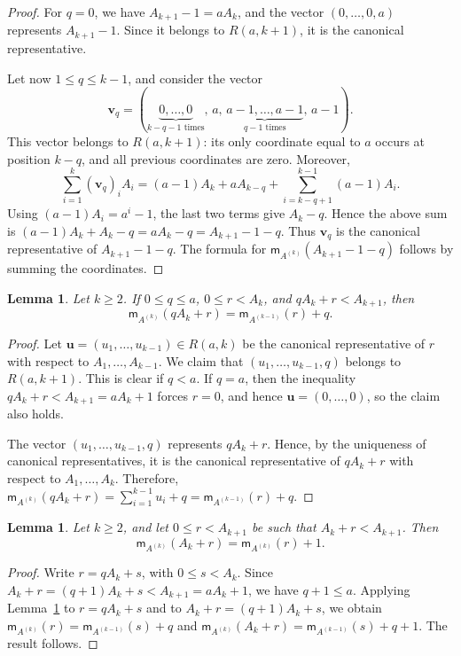 \documentclass[12pt,a4paper]{amsart}
\newtheorem{lemma}[theorem]{Lemma}
\theoremstyle{definition}
\begin{document}
\begin{proof}
For $q=0$, we have $A_{k+1}-1=aA_k$, and the vector $(0,\ldots,0,a)$ represents $A_{k+1}-1$. Since it belongs to $R(a,k+1)$, it is the canonical representative.

Let now $1\le q\le k-1$, and consider the vector
\[
\mathbf v_q=(\underbrace{0,\ldots,0}_{k-q-1\text{ times}},\,a,\,
\underbrace{a-1,\ldots,a-1}_{q-1\text{ times}},\,a-1).
\]
This vector belongs to $R(a,k+1)$: its only coordinate equal to $a$ occurs at position $k-q$, and all previous coordinates are zero. Moreover,
\[
\sum_{i=1}^k(\mathbf v_q)_iA_i
=(a-1)A_k+aA_{k-q}+\sum_{i=k-q+1}^{k-1}(a-1)A_i.
\]
Using $(a-1)A_i=a^i-1$, the last two terms give $A_k-q$. Hence the above sum is $(a-1)A_k+A_k-q=aA_k-q=A_{k+1}-1-q$. Thus $\mathbf v_q$ is the canonical representative of $A_{k+1}-1-q$. The formula for $\mathsf m_{A^{(k)}}(A_{k+1}-1-q)$ follows by summing the coordinates.
\end{proof}

\begin{lemma}\label{lem:splitting-lambda}
Let $k\ge 2$. If $0\le q\le a$, $0\le r<A_k$, and $qA_k+r<A_{k+1}$, then
\[
\mathsf m_{A^{(k)}}(qA_k+r)=\mathsf m_{A^{(k-1)}}(r)+q.
\]
\end{lemma}

\begin{proof}
Let $\mathbf u=(u_1,\ldots,u_{k-1})\in R(a,k)$ be the canonical representative of $r$ with respect to $A_1,\ldots,A_{k-1}$. We claim that $(u_1,\ldots,u_{k-1},q)$ belongs to $R(a,k+1)$. This is clear if $q<a$. If $q=a$, then the inequality $qA_k+r<A_{k+1}=aA_k+1$ forces $r=0$, and hence $\mathbf u=(0,\ldots,0)$, so the claim also holds.

The vector $(u_1,\ldots,u_{k-1},q)$ represents $qA_k+r$. Hence, by the uniqueness of canonical representatives, it is the canonical representative of $qA_k+r$ with respect to $A_1,\ldots,A_k$. Therefore, $\mathsf m_{A^{(k)}}(qA_k+r)=\sum_{i=1}^{k-1}u_i+q=\mathsf m_{A^{(k-1)}}(r)+q$.
\end{proof}

\begin{lemma}\label{lem:add-last-weight}
Let $k\ge 2$, and let $0\le r<A_{k+1}$ be such that $A_k+r<A_{k+1}$. Then
\[
\mathsf m_{A^{(k)}}(A_k+r)=\mathsf m_{A^{(k)}}(r)+1.
\]
\end{lemma}

\begin{proof}
Write $r=qA_k+s$, with $0\le s<A_k$. Since $A_k+r=(q+1)A_k+s<A_{k+1}=aA_k+1$, we have $q+1\le a$. Applying Lemma~\ref{lem:splitting-lambda} to $r=qA_k+s$ and to $A_k+r=(q+1)A_k+s$, we obtain $\mathsf m_{A^{(k)}}(r)=\mathsf m_{A^{(k-1)}}(s)+q$ and $\mathsf m_{A^{(k)}}(A_k+r)=\mathsf m_{A^{(k-1)}}(s)+q+1$. The result follows.
\end{proof}
\end{document}
